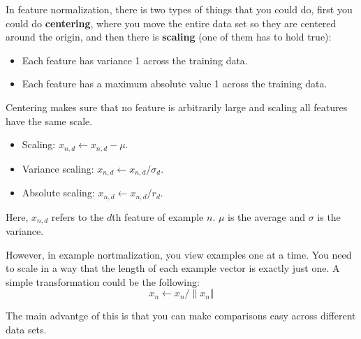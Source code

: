 \documentclass{article}
\begin{document}
\vspace{0.5cm}

In feature normalization, there is two types of things that you could do, first you could do \textbf{centering}, where you move the entire data set so they are centered around the origin, and then there is \textbf{scaling} (one of them has to hold true):
\begin{itemize}
    \item Each feature has variance 1 across the training data.
    \item Each feature has a maximum absolute value 1 across the training data.
\end{itemize}

Centering makes sure that no feature is arbitrarily large and scaling all features have the same scale. 

\vspace{0.5cm}

\begin{itemize}
    \item Scaling: $x_{n,d} \gets x_{n,d} - \mu$.
    \item Variance scaling: $x_{n,d} \gets x_{n,d}/\sigma_d$.
    \item Absolute scaling: $x_{n,d} \gets x_{n,d}/r_d$.
\end{itemize}

Here, $x_{n,d}$ refers to the $d$th feature of example $n$. $\mu$ is the average and $\sigma$ is the variance. 

\vspace{0.5cm}

However, in example nortmalization, you view examples one at a time. You need to scale in a way that the length of each example vector is exactly just one. A simple transformation could be the following: $$x_n \gets x_n/\| x_n\Vert $$

\vspace{0.5cm}

The main advantge of this is that you can make comparisons easy across different data sets.
\end{document}
